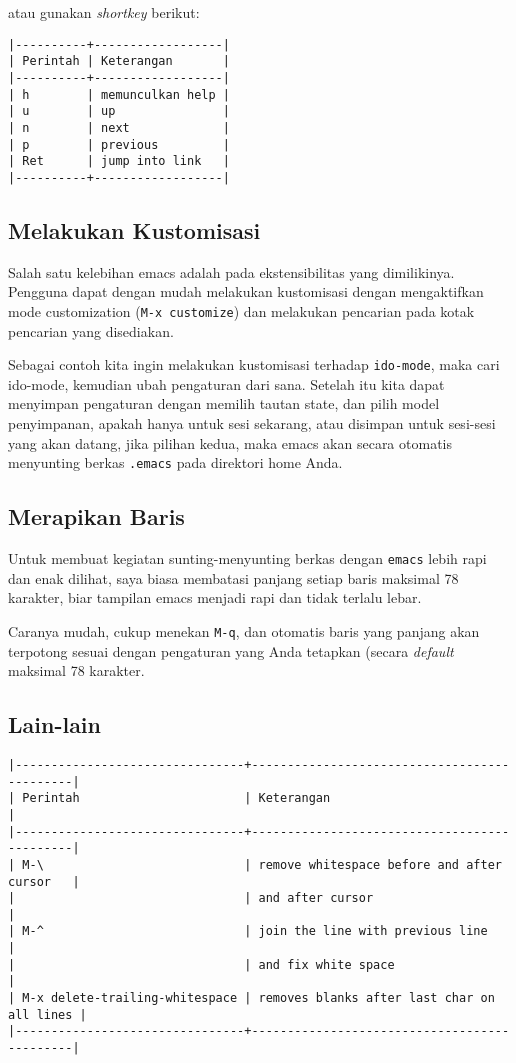 \documentclass{article}
\begin{document}
atau gunakan \emph{shortkey} berikut:

\begin{verbatim}
|----------+------------------|
| Perintah | Keterangan       |
|----------+------------------|
| h        | memunculkan help |
| u        | up               |
| n        | next             |
| p        | previous         |
| Ret      | jump into link   |
|----------+------------------|
\end{verbatim}

\subsection{Melakukan Kustomisasi}
Salah satu kelebihan emacs adalah pada ekstensibilitas yang
dimilikinya. Pengguna dapat dengan mudah melakukan kustomisasi dengan
mengaktifkan mode customization (\verb=M-x customize=) dan melakukan
pencarian pada kotak pencarian yang disediakan.

Sebagai contoh kita ingin melakukan kustomisasi terhadap
\verb=ido-mode=, maka cari ido-mode, kemudian ubah pengaturan dari
sana. Setelah itu kita dapat menyimpan pengaturan dengan memilih
tautan state, dan pilih model penyimpanan, apakah hanya untuk sesi
sekarang, atau disimpan untuk sesi-sesi yang akan datang, jika pilihan
kedua, maka emacs akan secara otomatis menyunting berkas \verb=.emacs=
pada direktori home Anda.

\subsection{Merapikan Baris}
Untuk membuat kegiatan sunting-menyunting berkas dengan \verb=emacs=
lebih rapi dan enak dilihat, saya biasa membatasi panjang setiap baris
maksimal 78 karakter, biar tampilan emacs menjadi rapi dan tidak terlalu
lebar.

Caranya mudah, cukup menekan \verb=M-q=, dan otomatis baris yang panjang
akan terpotong sesuai dengan pengaturan yang Anda tetapkan (secara 
\emph{default} maksimal 78 karakter.


\subsection{Lain-lain}

\begin{verbatim}
|--------------------------------+---------------------------------------------|
| Perintah                       | Keterangan                                  |
|--------------------------------+---------------------------------------------|
| M-\                            | remove whitespace before and after cursor   |
|                                | and after cursor                            |
| M-^                            | join the line with previous line            |
|                                | and fix white space                         |
| M-x delete-trailing-whitespace | removes blanks after last char on all lines |
|--------------------------------+---------------------------------------------|
\end{verbatim}
\end{document}
